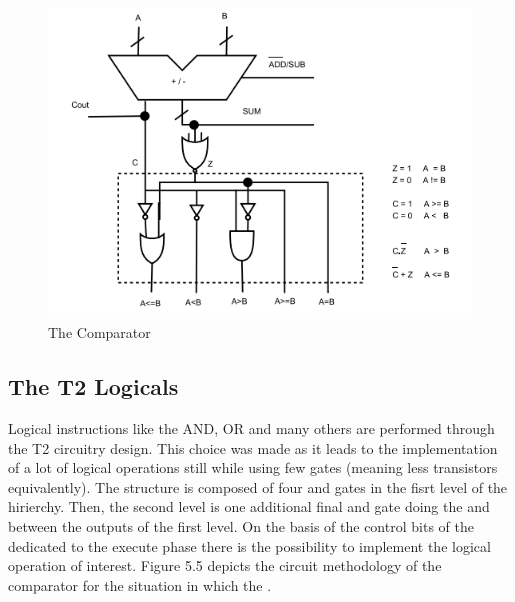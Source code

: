         \begin{figure}[h!]
            \centering
            \includegraphics[scale = .6]
            {chapters/figures/Comparator}
            \caption{The Comparator}
            \label{fig:T2Logic}
            \end{figure}

    \subsection{ The T2 Logicals }

    Logical instructions like the AND, OR and many others are performed through the T2 circuitry design. This choice was made as it leads
    to the implementation of a lot of logical operations still while using few gates (meaning less transistors equivalently). The structure is composed
    of four and gates in the fisrt level of the hirierchy. Then, the second level is one additional final and gate doing the and between the outputs of the first level.
    On the basis of the control bits of the dedicated to the execute phase there is the possibility to implement the logical operation of interest.
    Figure 5.5 depicts the circuit methodology of the comparator for the situation in which the .

